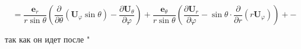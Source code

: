 \message{ !name(ex2.tex)}\documentclass{article}
\begin{document}
$$=\dfrac{\textbf{e}_r}{r\sin{\theta}}\left(\dfrac{\partial}{\partial\theta}\left(\textbf{U}_\varphi\sin{\theta}\right)-\dfrac{\partial\textbf{U}_\theta}{\partial\varphi}\right)+\dfrac{\textbf{e}_\theta}{r\sin{\theta}}\left(\dfrac{\partial\textbf{U}_r}{\partial\varphi}-\sin{\theta}\cdot\dfrac{\partial}{\partial r}\left(r\textbf{U}_\varphi\right)\right)+-$$

так как он идет после "
\end{document}
